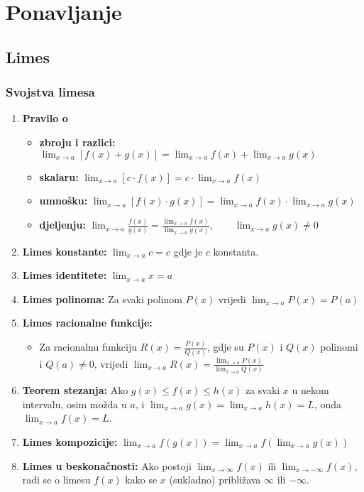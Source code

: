 \section{Ponavljanje}

\subsection{Limes}

\subsubsection{Svojstva limesa}

\begin{enumerate}
    \item \textbf{Pravilo o}
    \begin{itemize}
        \item \textbf{zbroju i razlici:} $\lim_{x \to a} [f(x) + g(x)] = \lim_{x \to a} f(x) + \lim_{x \to a} g(x)$
        \item \textbf{skalaru:} $\lim_{x \to a} [c \cdot f(x)] = c \cdot \lim_{x \to a} f(x)$
        \item \textbf{umnošku:} $\lim_{x \to a} [f(x) \cdot g(x)] = \lim_{x \to a} f(x) \cdot \lim_{x \to a} g(x)$
        \item \textbf{djeljenju:} $\lim_{x \to a} \frac{f(x)}{g(x)} = \frac{\lim_{x \to a} f(x)}{\lim_{x \to a} g(x)},\qquad \lim_{x \to a} g(x) \neq 0$
    \end{itemize}
    
    \item \textbf{Limes konstante:} $\lim_{x \to a} c = c$ gdje je $c$ konstanta.
    
    \item \textbf{Limes identitete:} $\lim_{x \to a} x = a$
    
    \item \textbf{Limes polinoma:} Za svaki polinom $P(x)$ vrijedi $\lim_{x \to a} P(x) = P(a)$
    
    \item \textbf{Limes racionalne funkcije:} 
    \begin{itemize}
        \item Za racionalnu funkciju $R(x) = \frac{P(x)}{Q(x)}$, gdje su $P(x)$ i $Q(x)$ polinomi i $Q(a) \neq 0$, vrijedi
              $\lim_{x \to a} R(x) = \frac{\lim_{x \to a} P(x)}{\lim_{x \to a} Q(x)}$
    \end{itemize}
    
    \item \textbf{Teorem stezanja:} Ako $g(x) \leq f(x) \leq h(x)$ za svaki $x$ u nekom intervalu, osim možda u $a$, i $\lim_{x \to a} g(x) = \lim_{x \to a} h(x) = L$, onda $\lim_{x \to a} f(x) = L$.
    
    \item \textbf{Limes kompozicije:} $\lim_{x \to a} f(g(x)) = \lim_{x \to a} f(\lim_{x \to a} g(x))$
    
    \item \textbf{Limes u beskonačnosti:} Ako postoji $\lim_{x \to \infty} f(x)$ ili $\lim_{x \to -\infty} f(x)$, radi se o limesu $f(x)$ kako se $x$ (sukladno) približava $\infty$ ili $-\infty$.
\end{enumerate}